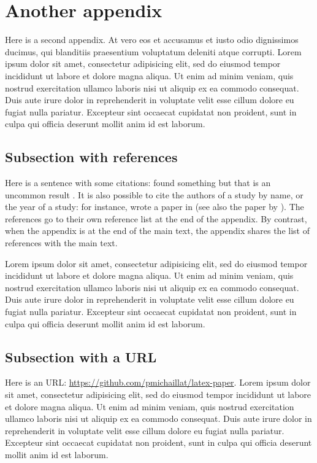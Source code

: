 \documentclass[letterpaper,11pt,leqno]{article}
\begin{document}
\section{Another appendix}\label{a:appendix2}

Here is a second appendix. At vero eos et accusamus et iusto odio dignissimos ducimus, qui blanditiis praesentium voluptatum deleniti atque corrupti. Lorem ipsum dolor sit amet, consectetur adipisicing elit, sed do eiusmod tempor incididunt ut labore et dolore magna aliqua. Ut enim ad minim veniam, quis nostrud exercitation ullamco laboris nisi ut aliquip ex ea commodo consequat. Duis aute irure dolor in reprehenderit in voluptate velit esse cillum dolore eu fugiat nulla pariatur. Excepteur sint occaecat cupidatat non
proident, sunt in culpa qui officia deserunt mollit anim id est laborum.

\subsection{Subsection with references}\label{a:subappendix}

Here is a sentence with some citations: \citet{MS19,MS21} found something but that is an uncommon result \citep[chapter 5]{M12}. It is also possible to cite the authors of a study by name, or the year of a study: for instance, \citeauthor{EMM21} wrote a paper in \citeyear{EMM21} (see also the paper by \citealp{M14}). The references go to their own reference list at the end of the appendix. By contrast, when the appendix is at the end of the main text, the appendix shares the list of references with the main text. 

Lorem ipsum dolor sit amet, consectetur adipisicing elit, sed do eiusmod
tempor incididunt ut labore et dolore magna aliqua. Ut enim ad minim veniam,
quis nostrud exercitation ullamco laboris nisi ut aliquip ex ea commodo
consequat. Duis aute irure dolor in reprehenderit in voluptate velit esse
cillum dolore eu fugiat nulla pariatur. Excepteur sint occaecat cupidatat non
proident, sunt in culpa qui officia deserunt mollit anim id est laborum.

\subsection{Subsection with a URL}

Here is an URL: \url{https://github.com/pmichaillat/latex-paper}. Lorem ipsum dolor sit amet, consectetur adipisicing elit, sed do eiusmod
tempor incididunt ut labore et dolore magna aliqua. Ut enim ad minim veniam,
quis nostrud exercitation ullamco laboris nisi ut aliquip ex ea commodo
consequat. Duis aute irure dolor in reprehenderit in voluptate velit esse
cillum dolore eu fugiat nulla pariatur. Excepteur sint occaecat cupidatat non
proident, sunt in culpa qui officia deserunt mollit anim id est laborum.
\end{document}
